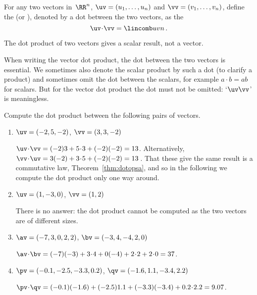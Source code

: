 \begin{definition} \label{def:dotprod}
For any two vectors in~\(\RR^n\), $\uv=(u_1,\ldots,u_n)$ and $\vv=(v_1,\ldots,v_n)$,
define the  (or ), denoted by a dot between the two vectors, as the 
\begin{equation*}
\uv\cdot \vv= \lincomb uvn\,.
\end{equation*}
\end{definition}

The dot product of two vectors gives a scalar result, not a vector.

When writing the vector dot product, the dot between the two vectors is essential.
We sometimes also denote the scalar product by such a dot (to clarify a product) and sometimes omit the dot between the scalars, for example \(a\cdot b=ab\) for scalars. 
But for the vector dot product the dot must not be omitted: `\(\uv\vv\)' is meaningless.


\begin{example} \label{eg:}
Compute the dot product between the following pairs of vectors.
\begin{enumerate}
\item \(\uv=(-2,5,-2)\), \(\vv=(3,3,-2)\)
\begin{solution} 
\(\uv\cdot\vv=(-2)3+5\cdot3+(-2)(-2)=13\). 
Alternatively, \(\vv\cdot\uv=3(-2)+3\cdot5+(-2)(-2)=13\)\,.
That these give the same result is a commutative law, Theorem~\ref{thm:dotopsa}, and so in the following we compute the dot product only one way around.
\end{solution}

\item \(\uv=(1,-3,0)\), \(\vv=(1,2)\)
\begin{solution} 
There is no answer: the dot product cannot be computed as the two vectors are of different sizes. 
\end{solution}

\item \(\av=(-7,3,0,2,2)\), \(\bv=(-3,4,-4,2,0)\)
\begin{solution} 
\(\av\cdot\bv=(-7)(-3)+3\cdot4+0(-4)+2\cdot2+2\cdot0=37\). 
\end{solution}

\item \(\pv=(-0.1,-2.5,-3.3,0.2)\), \(\qv=(-1.6,1.1,-3.4,2.2)\)
\begin{solution} 
\(\pv\cdot\qv=(-0.1)(-1.6)+(-2.5)1.1+(-3.3)(-3.4)+0.2\cdot2.2=9.07\).
\end{solution}
\end{enumerate}
\end{example}






